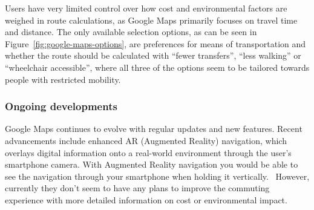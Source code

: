 Users have very limited control over how cost and environmental factors are weighed in route calculations, as Google
Maps primarily focuses on travel time and distance.
The only available selection options, as can be seen in Figure~\ref{fig:google-maps-options}, are preferences for means
of transportation and whether the route should be calculated with ``fewer transfers'', ``less walking'' or ``wheelchair
accessible'', where all three of the options seem to be tailored towards people with restricted mobility.

\subsubsection{Ongoing developments}\label{subsec:ongoing-developments}

Google Maps continues to evolve with regular updates and new features.
Recent advancements include enhanced AR (Augmented Reality) navigation, which overlays digital information onto
a real-world environment through the user's smartphone camera.
With Augmented Reality navigation you would be able to see the navigation through your smartphone when holding it
vertically.~\cite{googlemapsAR2023}
However, currently they don't seem to have any plans to improve the commuting experience with more detailed information
on cost or environmental impact.

